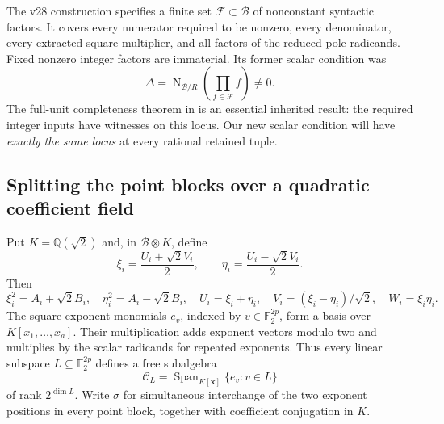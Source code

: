 \documentclass[11pt,a4paper]{article}
\theoremstyle{remark}\newtheorem{remark}[theorem]{Remark}
\newcommand{\Q}{\mathbb Q}\newcommand{\Z}{\mathbb Z}\newcommand{\F}{\mathbb F}\newcommand{\C}{\mathbb C}
\DeclareMathOperator{\N}{N}\DeclareMathOperator{\Tr}{Tr}\DeclareMathOperator{\Span}{Span}
\begin{document}
The v28 construction specifies a finite set $\mathcal F\subset\mathcal B$
of nonconstant syntactic factors. It covers every numerator required to
be nonzero, every denominator, every extracted square multiplier, and
all factors of the reduced pole radicands. Fixed nonzero integer factors
are immaterial. Its former scalar condition was
\begin{equation}\label{eq:oldguard}
                 \Delta=\N_{\mathcal B/R}\left(\prod_{f\in\mathcal F}f\right)\ne0.
\end{equation}
The full-unit completeness theorem in \cite{UnitNorm} is an essential
inherited result: the required integer inputs have witnesses on this
locus. Our new scalar condition will have \emph{exactly the same locus}
at every rational retained tuple.

\subsection{Splitting the point blocks over a quadratic coefficient field}
Put $K=\Q(\sqrt2)$ and, in $\mathcal B\otimes K$, define
\[
 \xi_i=\frac{U_i+\sqrt2V_i}{2},\qquad
 \eta_i=\frac{U_i-\sqrt2V_i}{2}.
\]
Then
\begin{equation}\label{eq:split}
 \xi_i^2=A_i+\sqrt2B_i,\quad \eta_i^2=A_i-\sqrt2B_i,
 \quad U_i=\xi_i+\eta_i,\quad
 V_i=(\xi_i-\eta_i)/\sqrt2,\quad W_i=\xi_i\eta_i.
\end{equation}
The square-exponent monomials $e_v$, indexed by $v\in\F_2^{2p}$,
form a basis over $K[x_1,\ldots,x_a]$. Their multiplication adds
exponent vectors modulo two and multiplies by the scalar radicands
for repeated exponents. Thus every linear subspace
$L\subseteq\F_2^{2p}$ defines a free subalgebra
\[
             \mathcal C_L=\Span_{K[\boldsymbol x]}\{e_v:v\in L\}
\]
of rank $2^{\dim L}$. Write $\sigma$ for simultaneous interchange of
the two exponent positions in every point block, together with
coefficient conjugation in $K$.
\end{document}
